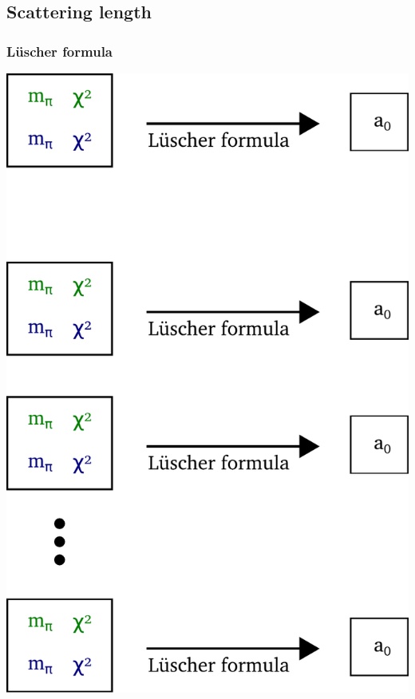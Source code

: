 \documentclass[english, fleqn]{beamer}
\begin{document}
\subsection{Scattering length}

\begin{frame}
    \frametitle{Lüscher formula}
    \begin{center}
        \includegraphics[scale=\scale]{sketches/07-luescher.pdf}
    \end{center}
\end{frame}
\end{document}
